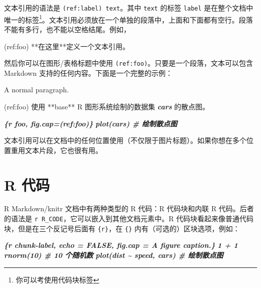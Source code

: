 \documentclass[
  12pt,
]{krantz}
\newenvironment{Shaded}{\begin{snugshade}}{\end{snugshade}}
\newcommand{\InformationTok}[1]{\textcolor[rgb]{0.56,0.35,0.01}{\textbf{\textit{#1}}}}
\newcommand{\NormalTok}[1]{#1}
\theoremstyle{definition}
\theoremstyle{definition}
\theoremstyle{definition}
\theoremstyle{definition}
\theoremstyle{remark}
\begin{document}
文本引用的语法是 \texttt{(ref:label)\ text}。其中 \texttt{text} 的标签 \texttt{label} 是在整个文档中唯一的标签\footnote{你可以考使用代码块标签}。文本引用必须放在一个单独的段落中，上面和下面都有空行。段落不能有多行，也不能以空格结尾。例如，

\begin{Shaded}
\begin{Highlighting}[]
\NormalTok{(ref:foo) **在这里**定义一个文本引用。}
\end{Highlighting}
\end{Shaded}

然后你可以在图形/表格标题中使用 \texttt{(ref:foo)}。只要是一个段落，文本可以包含 Markdown 支持的任何内容。下面是一个完整的示例：

\begin{Shaded}
\begin{Highlighting}[]
\NormalTok{A normal paragraph.}

\NormalTok{(ref:foo) 使用 **base** R 图形系统绘制的数据集 }\InformationTok{\textasciigrave{}cars\textasciigrave{}}\NormalTok{ 的散点图。}

\InformationTok{\textasciigrave{}\textasciigrave{}\textasciigrave{}\{r foo, fig.cap=\textquotesingle{}(ref:foo)\textquotesingle{}\}}
\InformationTok{plot(cars)  \# 绘制散点图}
\InformationTok{\textasciigrave{}\textasciigrave{}\textasciigrave{}}
\end{Highlighting}
\end{Shaded}

文本引用可以在文档中的任何位置使用（不仅限于图片标题）。如果你想在多个位置重用文本片段，它也很有用。

\section{R 代码}\label{r-code}

R Markdown/knitr 文档中有两种类型的 R 代码：R 代码块和内联 R 代码。后者的语法是 \texttt{\textasciigrave{}r\ R\_CODE\textasciigrave{}}，它可以嵌入到其他文档元素中。R 代码块看起来像普通代码块，但是在三个反记号后面有 \texttt{\{r\}}，在 \texttt{\{\}} 内有（可选的）区块选项，例如：

\begin{Shaded}
\begin{Highlighting}[]
\InformationTok{\textasciigrave{}\textasciigrave{}\textasciigrave{}\{r chunk{-}label, echo = FALSE, fig.cap = \textquotesingle{}A figure caption.\textquotesingle{}\}}
\InformationTok{1 + 1}
\InformationTok{rnorm(10)  \# 10 个随机数}
\InformationTok{plot(dist \textasciitilde{} speed, cars)  \# 绘制散点图}
\InformationTok{\textasciigrave{}\textasciigrave{}\textasciigrave{}}
\end{Highlighting}
\end{Shaded}
\end{document}
